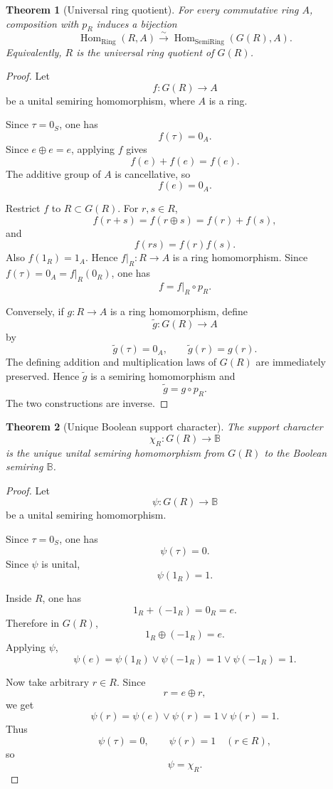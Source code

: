 \documentclass[11pt]{article}
\newtheorem{theorem}{Theorem}[section]
\newcommand{\BB}{\mathbb B}
\newcommand{\Hom}{\operatorname{Hom}}
\begin{document}
\begin{theorem}[Universal ring quotient]
For every commutative ring \(A\), composition with \(p_R\) induces a bijection
\[
\Hom_{\mathrm{Ring}}(R,A)
\xrightarrow{\sim}
\Hom_{\mathrm{SemiRing}}(G(R),A).
\]
Equivalently, \(R\) is the universal ring quotient of \(G(R)\).
\end{theorem}

\begin{proof}
Let
\[
f:G(R)\to A
\]
be a unital semiring homomorphism, where \(A\) is a ring.

Since \(\tau=0_S\), one has
\[
f(\tau)=0_A.
\]
Since \(e\oplus e=e\), applying \(f\) gives
\[
f(e)+f(e)=f(e).
\]
The additive group of \(A\) is cancellative, so
\[
f(e)=0_A.
\]

Restrict \(f\) to \(R\subset G(R)\). For \(r,s\in R\),
\[
f(r+s)=f(r\oplus s)=f(r)+f(s),
\]
and
\[
f(rs)=f(r)f(s).
\]
Also \(f(1_R)=1_A\). Hence \(f|_R:R\to A\) is a ring homomorphism. Since \(f(\tau)=0_A=f|_R(0_R)\), one has
\[
f=f|_R\circ p_R.
\]

Conversely, if \(g:R\to A\) is a ring homomorphism, define
\[
\widetilde g:G(R)\to A
\]
by
\[
\widetilde g(\tau)=0_A,\qquad \widetilde g(r)=g(r).
\]
The defining addition and multiplication laws of \(G(R)\) are immediately preserved. Hence \(\widetilde g\) is a semiring homomorphism and
\[
\widetilde g=g\circ p_R.
\]
The two constructions are inverse.
\end{proof}

\begin{theorem}[Unique Boolean support character]
The support character
\[
\chi_R:G(R)\to\BB
\]
is the unique unital semiring homomorphism from \(G(R)\) to the Boolean semiring \(\BB\).
\end{theorem}

\begin{proof}
Let
\[
\psi:G(R)\to\BB
\]
be a unital semiring homomorphism.

Since \(\tau=0_S\), one has
\[
\psi(\tau)=0.
\]
Since \(\psi\) is unital,
\[
\psi(1_R)=1.
\]

Inside \(R\), one has
\[
1_R+(-1_R)=0_R=e.
\]
Therefore in \(G(R)\),
\[
1_R\oplus (-1_R)=e.
\]
Applying \(\psi\),
\[
\psi(e)=\psi(1_R)\vee\psi(-1_R)=1\vee\psi(-1_R)=1.
\]

Now take arbitrary \(r\in R\). Since
\[
r=e\oplus r,
\]
we get
\[
\psi(r)=\psi(e)\vee\psi(r)=1\vee\psi(r)=1.
\]
Thus
\[
\psi(\tau)=0,\qquad \psi(r)=1\quad(r\in R),
\]
so
\[
\psi=\chi_R.
\]
\end{proof}
\end{document}
